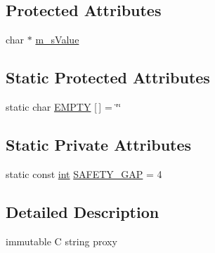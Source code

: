 \subsection*{Protected Attributes}
\begin{DoxyCompactItemize}
\item 
char $\ast$ \hyperlink{structCSphString_aa50edef52196b0da669df201b63364ae}{m\-\_\-s\-Value}
\end{DoxyCompactItemize}
\subsection*{Static Protected Attributes}
\begin{DoxyCompactItemize}
\item 
static char \hyperlink{structCSphString_ace1090ac1799f9efee5c0b6eddec9fc3}{E\-M\-P\-T\-Y} \mbox{[}$\,$\mbox{]} = \char`\"{}\char`\"{}
\end{DoxyCompactItemize}
\subsection*{Static Private Attributes}
\begin{DoxyCompactItemize}
\item 
static const \hyperlink{sphinxexpr_8cpp_a4a26e8f9cb8b736e0c4cbf4d16de985e}{int} \hyperlink{structCSphString_abc41c0298d1db9d9a09c839a926b2f2e}{S\-A\-F\-E\-T\-Y\-\_\-\-G\-A\-P} = 4
\end{DoxyCompactItemize}


\subsection{Detailed Description}
immutable C string proxy 

